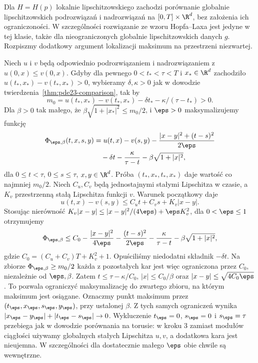 \begin{uwaga}
Dla $H=H(p)$ lokalnie lipschitzowskiego zachodzi
porównanie globalnie lipschitzowskich podrozwiązań
i nadrozwiązań na $[0,T]\times\R^d$, bez założenia
ich ograniczoności.
W szczególności rozwiązanie ze wzoru Hopfa--Laxa
jest jedyne w tej klasie, także dla nieograniczonych
globalnie lipschitzowskich danych $g$. Rozpiszmy dodatkowy argument
lokalizacji maksimum na przestrzeni niezwartej.

Niech $u$ i $v$ będą odpowiednio podrozwiązaniem
i nadrozwiązaniem z $u(0,x)\le v(0,x)$.
Gdyby dla pewnego $0<t_*<\tau<T$ i $x_*\in\R^d$
zachodziło $u(t_*,x_*)-v(t_*,x_*)>0$, wybieramy
$\delta,\kappa>0$ jak w dowodzie
twierdzenia~\ref{thm:pde23-comparison}, tak by
\[
 m_0=u(t_*,x_*)-v(t_*,x_*)-\delta t_*
                 -\kappa/(\tau-t_*)>0.
\]
Dla $\beta>0$ tak małego, że
$\beta\sqrt{1+|x_*|^2}\le m_0/2$, i $\eps>0$
maksymalizujemy funkcję
\[
 \begin{split}
 \Phi_{\eps,\beta}(t,x,s,y)
 &=u(t,x)-v(s,y)-\frac{|x-y|^2+(t-s)^2}{2\eps}\\
 &\quad-\delta t-\frac{\kappa}{\tau-t}
       -\beta\sqrt{1+|x|^2},
 \end{split}
\]
dla $0\le t<\tau$, $0\le s\le\tau$,
$x,y\in\R^d$. Próba $(t_*,x_*,t_*,x_*)$
daje wartość co najmniej $m_0/2$.
Niech $C_u,C_v$ będą jednostajnymi stałymi
Lipschitza w czasie, a $K_v$ przestrzenną
stałą Lipschitza funkcji $v$. Warunek początkowy
daje
\[
 u(t,x)-v(s,y)
 \le C_u t+C_v s+K_v|x-y|.
\]
Stosując nierówność
$K_v|x-y|\le |x-y|^2/(4\eps)+\eps K_v^2$,
dla $0<\eps\le1$ otrzymujemy
\[
 \Phi_{\eps,\beta}
 \le C_0-\frac{|x-y|^2}{4\eps}
 -\frac{(t-s)^2}{2\eps}
 -\frac{\kappa}{\tau-t}-\beta\sqrt{1+|x|^2},
\]
gdzie $C_0=(C_u+C_v)T+K_v^2+1$.
Opuściliśmy niedodatni składnik $-\delta t$.
Na zbiorze $\Phi_{\eps,\beta}\ge m_0/2$
każda z pozostałych kar jest więc ograniczona
przez $C_0$, niezależnie od $\eps,\beta$.
Zatem $t\le\tau-\kappa/C_0$,
$|x|\le C_0/\beta$ oraz
$|x-y|\le\sqrt{4C_0\eps}$. To pozwala
ograniczyć maksymalizację do zwartego zbioru,
na którym maksimum jest osiągane.
Oznaczmy punkt maksimum przez $(t_\eps,x_\eps,s_\eps,y_\eps)$,
przy ustalonej $\beta$.
Z tych samych ograniczeń wynika
$|x_\eps-y_\eps|+|t_\eps-s_\eps|\to0$.
Wykluczenie $t_\eps=0$, $s_\eps=0$ i
$s_\eps=\tau$ przebiega jak w dowodzie porównania
na torusie: w kroku 3 zamiast modułów ciągłości
używamy globalnych stałych Lipschitza $u,v$,
a dodatkowa kara jest nieujemna.
W szczególności dla dostatecznie małego $\eps$
obie chwile są wewnętrzne.


\end{uwaga}
